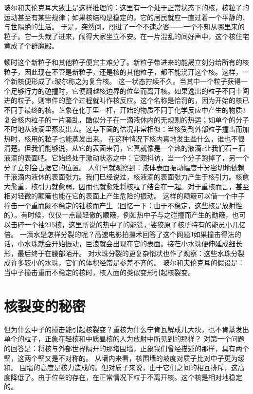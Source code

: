 玻尔和夫伦克耳大致上是这样推理的：这里有一个处于正常状态下的核，核粒子的运动甚至有某些规律；如果核结构是稳定的，它的居民就应一直过着一个平静的、与世隔绝的生活。
于是，突然间，闯进了一个不速之客——一个不知从哪里来的粒子。它一头栽了进来，闹得大家坐立不安。在一片混乱的间好声中，这个核住宅竟成了个群魔殿。

顿时这个新粒子和其他粒子便宾主难分了。新粒子带进来的能晟立刻分给所有的核粒子，因此现在不管是新粒子，还是核的其他粒子，都不能浇开这个核。这样，一个新核便形成了c玻尔称之为复合核。
这一状态拧续不久。当其中一个粒子获得一个足够行力的砬撞时，它便翻越核边界的位垒而离开核。如果逸出的粒子不同十闯进的粒子，则审件的整个过程就叫作核反应。这个名称是恰罚的，因为开始的核已不同于最终的核。芷象在化于里一杆，开始的物质不同于化学反应中产生的物质3
复合核内粒子的一片骚乱，酷似分子在一滴液休内的无规则的热运；如单个的分子不时地从液滴里蒸发出去。这与下面的估况非常相似：当核受到外部粒子撞击而加热时，核用的粒子也能蒸发出来。
在这种悄况下核内真地发生些什么，谁也不很清楚。但我们能够说，从它的表面来罚，它真就像是一个热的液滴c让我们石－石液滴的表面吧。它始终处于激动状态之中：它颇抖访，当一个分子跑掉了，另一个分子立刻会占据它的位置。
人们早就观察到：液体表面振动幅度十分密切地依赖于液滴内液休的表面张力。我们巳经说过，核液滴的表面张力产生于核引力。核愈大愈重，核引力就愈弱，因而也就愈难将核粒子结合在一起。对于重核而言，甚至相对轻微的颠簸也能在它的表面上产生危险的振动。
这样的颠簸可以借一个中子撞击一个重而颇不稳定的铀核而产生（回忆一下：由于不稳定，这些核是放射性的）。有时候，仅仅一点最轻傲的顺簸，例如热中子与之碰撞而产生的勋簸，也可以击碎一个袖235核，这里所说的热中子的能赞，娑狡原子核所特有的能员小几亿倍。
一滴水是怎样分裂的呢？高速电影拍摄术回答了这个网题J如果撞击得法的话，小水珠就会开始振动，巨浪就会出现在它的表面。接芢小水珠便伸延成细长形，最后终于在腰部陌开。
对水珠分裂的更复杂悄状也作了观察：这些水珠分裂成许多较小的水珠，它们的体积经常是参差不齐的。
玻尔和夫伦克耳的假设是：当中子撞击重而不稳定的核时，核入面的类似变形引起核裂变。

\section{核裂变的秘密}

但为什么中子的撞击能引起核裂变？重核为什么宁肯瓦解成儿大块，也不肯蒸发出单个的粒子，正象在轻核和中质昼核的人为放射中所见到的那样？
对第一个问题的回答是：将核与外部世界隔开的那堵围墙，正象我们曾经描述的那样，具有两个壁，这两个壁又是不对称的。
从墙内来看，核围墙的坡度对质子比对中子更为缓和。
围墙的高度是核力造成的。但对质子来说，由于它们之间的相互排斥，这高度降低了。由于位垒的存在，在正常情况下粒于不离开核。这个核是相对地稳定的。

